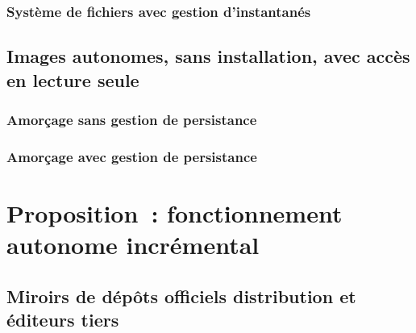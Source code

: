 \ml
{\subsection{\todo}}
{\subsection{Système de fichiers avec gestion d’instantanés}}

\ml
{\section{\todo}}
{\section{Images autonomes, sans installation, avec accès en lecture seule}}

\ml
{\subsection{\todo}}
{\subsection{Amorçage sans gestion de persistance}}

\ml
{\subsection{\todo}}
{\subsection{Amorçage avec gestion de persistance}}

\ml
{\chapter{\todo}}
{\chapter{Proposition : fonctionnement autonome incrémental}}

\ml
{\section{\todo}}
{\section{Miroirs de dépôts officiels distribution et éditeurs tiers}}


